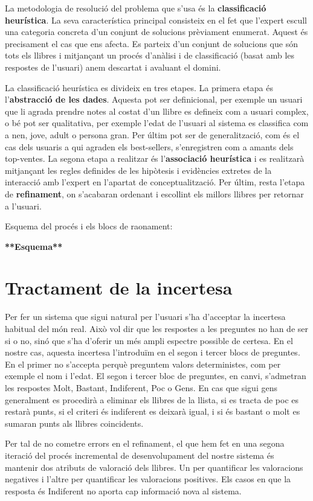 La metodologia de resolució del problema que s'usa és la \textbf{classificació heurística}. La seva característica principal consisteix en el fet que l'expert escull una categoria concreta d'un conjunt de solucions prèviament enumerat. Aquest és precisament el cas que ens afecta. Es parteix d'un conjunt de solucions que són tots els llibres i mitjançant un procés d'anàlisi i de classificació (basat amb les respostes de l'usuari) anem descartat i avaluant el domini.

La classificació heurística es divideix en tres etapes. La primera etapa és l'\textbf{abstracció de les dades}. Aquesta pot ser definicional, per exemple un usuari que li agrada prendre notes al costat d'un llibre es defineix com a usuari complex, o bé pot ser qualitativa, per exemple l'edat de l'usuari al sistema es classifica com a nen, jove, adult o persona gran. Per últim pot ser de generalització, com és el cas dels usuaris a qui agraden els best-sellers, s'enregistren com a amants dels top-ventes. La segona etapa a realitzar és l'\textbf{associació heurística} i es realitzarà mitjançant les regles definides de les hipòtesis i evidències extretes de la interacció amb l'expert en l'apartat de conceptualització. Per últim, resta l'etapa de \textbf{refinament}, on s'acabaran ordenant i escollint els millors llibres per retornar a l'usuari.

Esquema del procés i els blocs de raonament:

\textbf{**Esquema**}

\section{Tractament de la incertesa}

Per fer un sistema que sigui natural per l'usuari s'ha d'acceptar la incertesa habitual del món real. Això vol dir que les respostes a les preguntes no han de ser si o no, sinó que s'ha d'oferir un més ampli espectre possible de certesa. En el nostre cas, aquesta incertesa l'introduïm en el segon i tercer blocs de preguntes. En el primer no s'accepta perquè preguntem valors deterministes, com per exemple el nom i l'edat. El segon i tercer bloc de preguntes, en canvi, s'admetran les respostes Molt, Bastant, Indiferent, Poc o Gens. En cas que sigui gens generalment es procedirà a eliminar els llibres de la llista, si es tracta de poc es restarà punts, si el criteri és indiferent es deixarà igual, i si és bastant o molt es sumaran punts als llibres coincidents.

Per tal de no cometre errors en el refinament, el que hem fet en una segona iteració del procés incremental de desenvolupament del nostre sistema és mantenir dos atributs de valoració dels llibres. Un per quantificar les valoracions negatives i l'altre per quantificar les valoracions positives. Els casos en que la resposta és Indiferent no aporta cap informació nova al sistema.


